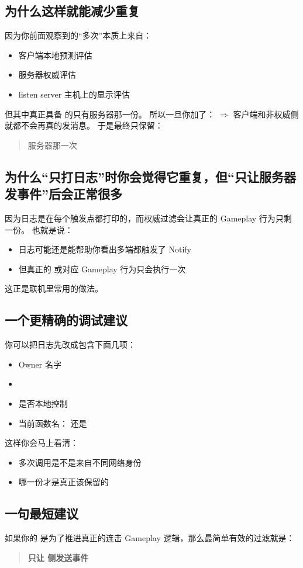 \subsection{为什么这样就能减少重复}
因为你前面观察到的“多次”本质上来自：
\begin{itemize} \item 客户端本地预测评估 \item 服务器权威评估 \item listen server 主机上的显示评估 \end{itemize}
但其中真正具备  的只有服务器那一份。
所以一旦你加了：
 $\Rightarrow$  
客户端和非权威侧就都不会再真的发消息。
于是最终只保留：
\begin{quote} 服务器那一次 \end{quote}
\subsection{为什么“只打日志”时你会觉得它重复，但“只让服务器发事件”后会正常很多}
因为日志是在每个触发点都打印的，而权威过滤会让真正的 Gameplay 行为只剩一份。
也就是说：
\begin{itemize} \item 日志可能还是能帮助你看出多端都触发了 Notify \item 但真正的  或对应 Gameplay 行为只会执行一次 \end{itemize}
这正是联机里常用的做法。
\subsection{一个更精确的调试建议}
你可以把日志先改成包含下面几项：
\begin{itemize} \item Owner 名字 \item {} \item 是否本地控制 \item 当前函数名： 还是  \end{itemize}
这样你会马上看清：
\begin{itemize} \item 多次调用是不是来自不同网络身份 \item 哪一份才是真正该保留的 \end{itemize}
\subsection{一句最短建议}
如果你的  是为了推进真正的连击 Gameplay 逻辑，那么最简单有效的过滤就是：
\begin{quote} \textbf{只让  侧发送事件} \end{quote}
